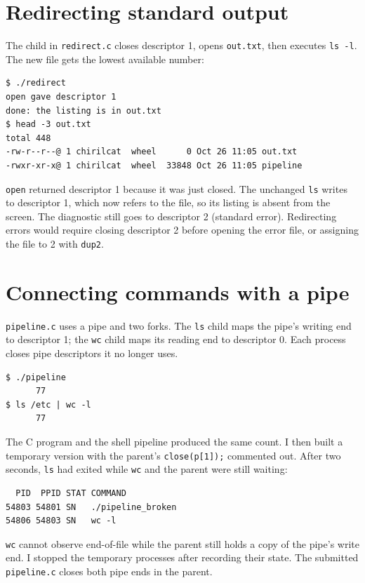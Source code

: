 \documentclass[12pt]{article}
\begin{document}
\section{Redirecting standard output}
The child in \texttt{redirect.c} closes descriptor 1, opens \texttt{out.txt},
then executes \texttt{ls -l}. The new file gets the lowest available number:

\begin{lstlisting}
$ ./redirect
open gave descriptor 1
done: the listing is in out.txt
$ head -3 out.txt
total 448
-rw-r--r--@ 1 chirilcat  wheel      0 Oct 26 11:05 out.txt
-rwxr-xr-x@ 1 chirilcat  wheel  33848 Oct 26 11:05 pipeline
\end{lstlisting}

\texttt{open} returned descriptor 1 because it was just closed. The unchanged
\texttt{ls} writes to descriptor 1, which now refers to the file, so its
listing is absent from the screen. The diagnostic still goes to descriptor 2
(standard error). Redirecting errors would require closing descriptor 2
before opening the error file, or assigning the file to 2 with \texttt{dup2}.

\clearpage
\section{Connecting commands with a pipe}
\texttt{pipeline.c} uses a pipe and two forks. The \texttt{ls} child maps the
pipe's writing end to descriptor 1; the \texttt{wc} child maps its reading
end to descriptor 0. Each process closes pipe descriptors it no longer uses.

\begin{lstlisting}
$ ./pipeline
      77
$ ls /etc | wc -l
      77
\end{lstlisting}

The C program and the shell pipeline produced the same count. I then built
a temporary version with the parent's \texttt{close(p[1]);} commented out.
After two seconds, \texttt{ls} had exited while \texttt{wc} and the parent
were still waiting:

\begin{lstlisting}
  PID  PPID STAT COMMAND
54803 54801 SN   ./pipeline_broken
54806 54803 SN   wc -l
\end{lstlisting}

\texttt{wc} cannot observe end-of-file while the parent still holds a copy
of the pipe's write end. I stopped the temporary processes after recording
their state. The submitted \texttt{pipeline.c} closes both pipe ends in the
parent.
\end{document}
